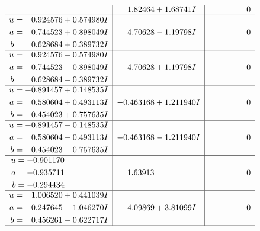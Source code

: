\documentclass[1p]{elsarticle_modified}
\theoremstyle{definition}
\begin{document}
$$\begin{array}{c|c|c}
 & \phantom{-}1.82464 + 1.68741 I & \phantom{-0.000000 } 0 \\ \hline\begin{aligned}
u &= \phantom{-}0.924576 + 0.574980 I \\
a &= \phantom{-}0.744523 + 0.898049 I \\
b &= \phantom{-}0.628684 + 0.389732 I\end{aligned}
 & \phantom{-}4.70628 - 1.19798 I & \phantom{-0.000000 } 0 \\ \hline\begin{aligned}
u &= \phantom{-}0.924576 - 0.574980 I \\
a &= \phantom{-}0.744523 - 0.898049 I \\
b &= \phantom{-}0.628684 - 0.389732 I\end{aligned}
 & \phantom{-}4.70628 + 1.19798 I & \phantom{-0.000000 } 0 \\ \hline\begin{aligned}
u &= -0.891457 + 0.148535 I \\
a &= \phantom{-}0.580604 + 0.493113 I \\
b &= -0.454023 + 0.757635 I\end{aligned}
 & -0.463168 + 1.211940 I & \phantom{-0.000000 } 0 \\ \hline\begin{aligned}
u &= -0.891457 - 0.148535 I \\
a &= \phantom{-}0.580604 - 0.493113 I \\
b &= -0.454023 - 0.757635 I\end{aligned}
 & -0.463168 - 1.211940 I & \phantom{-0.000000 } 0 \\ \hline\begin{aligned}
u &= -0.901170\phantom{ +0.000000I} \\
a &= -0.935711\phantom{ +0.000000I} \\
b &= -0.294434\phantom{ +0.000000I}\end{aligned}
 & \phantom{-}1.63913\phantom{ +0.000000I} & \phantom{-0.000000 } 0 \\ \hline\begin{aligned}
u &= \phantom{-}1.006520 + 0.441039 I \\
a &= -0.247645 - 1.046270 I \\
b &= \phantom{-}0.456261 - 0.622717 I\end{aligned}
 & \phantom{-}4.09869 + 3.81099 I & \phantom{-0.000000 } 0\\
 \hline 
 \end{array}$$\newpage$$\begin{array}{c|c|c}  

\end{array}$$
\end{document}
